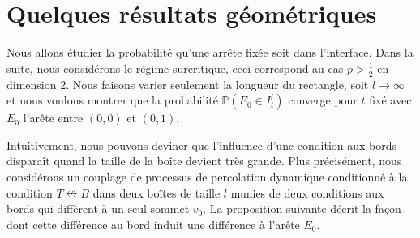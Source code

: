 \documentclass[titlepage,a4paper,12pt]{article}
\newcounter{prop}
\newcounter{cor}
\begin{document}
\section{Quelques résultats géométriques}
Nous allons étudier la probabilité qu'une arrête fixée soit dans l'interface. Dans la suite, nous considérons le régime surcritique, ceci correspond au cas $p>\frac{1}{2}$ en dimension 2. Nous faisons varier seulement la longueur du rectangle, soit $l \rightarrow \infty$ et nous voulons montrer que la probabilité $\mathbb{P}(E_0 \in I^l_t)$ converge pour $t$ fixé avec $E_0$ l'arête entre $(0,0)$ et $(0,1)$.

Intuitivement, nous pouvons deviner que l'influence d'une condition aux bords disparaît quand la taille de la boîte devient très grande. Plus précisément, nous considérons un couplage de processus de percolation dynamique conditionné à la condition $T\nleftrightarrow B$ dans deux boîtes de taille $l$ munies de deux conditions aux bords qui diffèrent à un seul sommet $v_0$. La proposition suivante décrit la façon dont cette différence au bord induit une différence à l'arête $E_0$.
\end{document}
